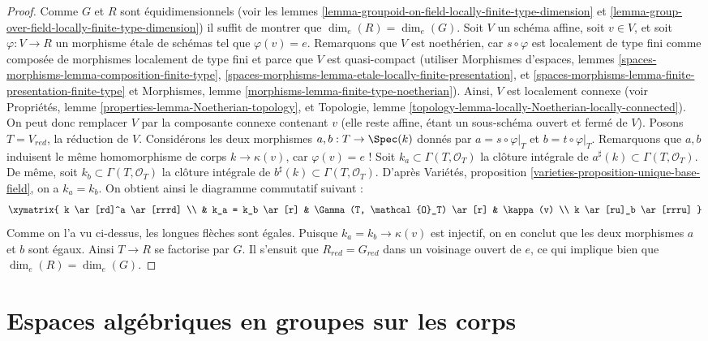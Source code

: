 \begin{proof}
Comme $G$ et $R$ sont équidimensionnels (voir les
lemmes \ref{lemma-groupoid-on-field-locally-finite-type-dimension} et
\ref{lemma-group-over-field-locally-finite-type-dimension})
il suffit de montrer que $\dim_e(R) = \dim_e(G)$. Soit $V$ un schéma affine,
soit $v \in V$, et soit $\varphi : V \to R$ un morphisme étale de schémas
tel que $\varphi(v) = e$. Remarquons que $V$ est noethérien, car
$s \circ \varphi$ est localement de type fini comme composée de morphismes
localement de type fini et parce que $V$ est quasi-compact (utiliser
Morphismes d'espaces, lemmes
\ref{spaces-morphisms-lemma-composition-finite-type},
\ref{spaces-morphisms-lemma-etale-locally-finite-presentation}, et
\ref{spaces-morphisms-lemma-finite-presentation-finite-type}
et
Morphismes, lemme \ref{morphisms-lemma-finite-type-noetherian}).
Ainsi, $V$ est localement connexe (voir
Propriétés, lemme \ref{properties-lemma-Noetherian-topology},
et
Topologie, lemme \ref{topology-lemma-locally-Noetherian-locally-connected}).
On peut donc remplacer $V$ par la composante connexe contenant $v$ (elle
reste affine, étant un sous-schéma ouvert et fermé de $V$).
Posons $T = V_{red}$, la réduction de $V$. Considérons les deux
morphismes $a, b : T \to \Spec(k)$ donnés par
$a = s \circ \varphi|_T$ et $b = t \circ \varphi|_T$. Remarquons que
$a, b$ induisent le même homomorphisme de corps $k \to \kappa(v)$, car $\varphi(v) = e$ !
Soit $k_a \subset \Gamma(T, \mathcal{O}_T)$ la clôture intégrale de
$a^\sharp(k) \subset \Gamma(T, \mathcal{O}_T)$. De même, soit
$k_b \subset \Gamma(T, \mathcal{O}_T)$ la clôture intégrale de
$b^\sharp(k) \subset \Gamma(T, \mathcal{O}_T)$. D'après
Variétés, proposition \ref{varieties-proposition-unique-base-field},
on a $k_a = k_b$. On obtient ainsi le diagramme commutatif suivant :
$$
\xymatrix{
k \ar[rd]^a \ar[rrrd] \\
& k_a = k_b \ar[r] & \Gamma(T, \mathcal{O}_T) \ar[r] & \kappa(v) \\
k \ar[ru]_b \ar[rrru]
}
$$
Comme on l'a vu ci-dessus, les longues flèches sont égales.
Puisque $k_a = k_b \to \kappa(v)$ est injectif, on en conclut que
les deux morphismes $a$ et $b$ sont égaux. Ainsi $T \to R$ se factorise par $G$.
Il s'ensuit que $R_{red} = G_{red}$ dans un voisinage ouvert de $e$,
ce qui implique bien que $\dim_e(R) = \dim_e(G)$.
\end{proof}






\section{Espaces algébriques en groupes sur les corps}
\label{section-group-algebraic-spaces-over-fields}

